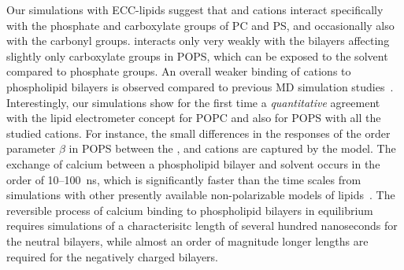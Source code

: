 Our simulations with ECC-lipids suggest that
 and  cations
interact specifically with the phosphate and carboxylate groups of PC and PS, 
and occasionally also with the carbonyl groups. 
 interacts only very weakly with the bilayers
affecting slightly only carboxylate groups in POPS,
which can be exposed to the solvent compared to phosphate groups. 
An overall weaker binding of cations to phospholipid bilayers is observed 
compared to previous MD simulation studies~\citep{nmrlipids_proj4, catte16, bockmann03, bockmann04, melcrova16, javanainen17}. 
Interestingly,
our simulations show for the first time a \emph{quantitative} agreement with the lipid electrometer concept
for POPC and also for POPS with all the studied cations. 
For instance, the small differences 
in the responses of the order parameter $\beta$ in POPS
between the 
,  and  cations
are captured by the model. 
The exchange of calcium between a phospholipid bilayer and solvent 
occurs in the order of 10--100~ns, 
which is significantly faster than the time scales from simulations 
with other presently available non-polarizable models of lipids~\citep{melcrova16, javanainen17, catte16}. 
The reversible process of calcium binding to phospholipid bilayers in equilibrium
requires simulations of a characterisitc length of several hundred nanoseconds 
for the neutral bilayers,
while almost an order of magnitude longer lengths 
are required for the negatively charged bilayers. 




